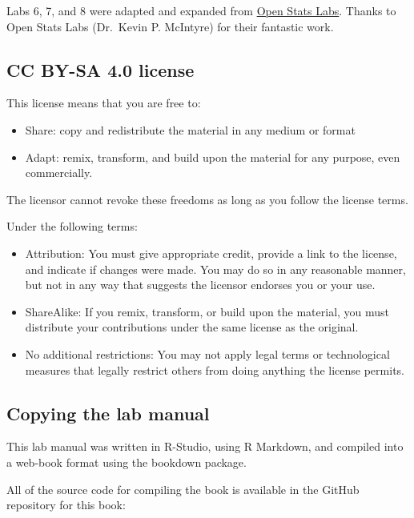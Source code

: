 \documentclass[
]{book}
\providecommand{\tightlist}{%
  \setlength{\itemsep}{0pt}\setlength{\parskip}{0pt}}
\begin{document}
Labs 6, 7, and 8 were adapted and expanded from \href{https://sites.trinity.edu/osl}{Open Stats Labs}. Thanks to Open Stats Labs (Dr.~Kevin P. McIntyre) for their fantastic work.

\hypertarget{cc-by-sa-4.0-license}{%
\subsection{CC BY-SA 4.0 license}\label{cc-by-sa-4.0-license}}

This license means that you are free to:

\begin{itemize}
\tightlist
\item
  Share: copy and redistribute the material in any medium or format
\item
  Adapt: remix, transform, and build upon the material for any purpose, even commercially.
\end{itemize}

The licensor cannot revoke these freedoms as long as you follow the license terms.

Under the following terms:

\begin{itemize}
\tightlist
\item
  Attribution: You must give appropriate credit, provide a link to the license, and indicate if changes were made. You may do so in any reasonable manner, but not in any way that suggests the licensor endorses you or your use.
\item
  ShareAlike: If you remix, transform, or build upon the material, you must distribute your contributions under the same license as the original.
\item
  No additional restrictions: You may not apply legal terms or technological measures that legally restrict others from doing anything the license permits.
\end{itemize}

\hypertarget{copying-the-lab-manual}{%
\subsection{Copying the lab manual}\label{copying-the-lab-manual}}

This lab manual was written in R-Studio, using R Markdown, and compiled into a web-book format using the bookdown package.

All of the source code for compiling the book is available in the GitHub repository for this book:
\end{document}
